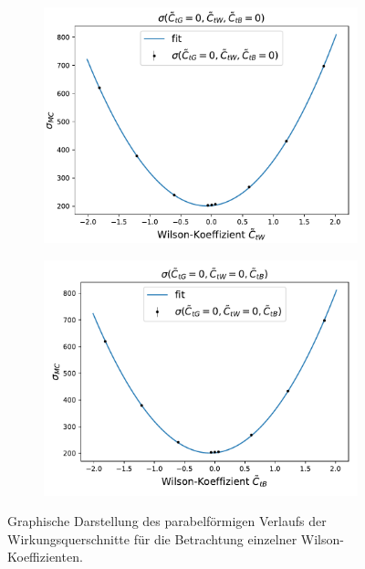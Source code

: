 \begin{figure}
  \begin{subfigure}[c]{0.5\textwidth}
    \centering
    \includegraphics[width=\textwidth]{Plots/combi_plot_tW.pdf}
    \label{fig:WtW}
  \end{subfigure}
  \begin{subfigure}[c]{0.5\textwidth}
    \centering
    \includegraphics[width=\textwidth]{Plots/combi_plot_tB.pdf}
    \label{fig:WtB}
  \end{subfigure}
  \caption{Graphische Darstellung des parabelförmigen Verlaufs der Wirkungsquerschnitte für die Betrachtung einzelner Wilson-Koeffizienten.}
  \label{fig:tp}
\end{figure}
